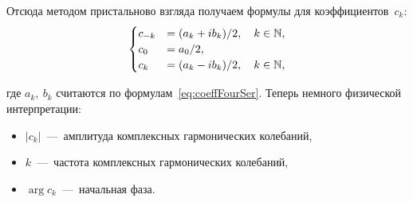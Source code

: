 \documentclass[../main.tex]{subfiles}
\begin{document}
Отсюда методом пристальново взгляда получаем формулы для коэффициентов~$c_k$:
\begin{align*}\label{eq:fourSerExp}
    \begin{cases}
    c_{-k} &= (a_k + ib_k)/2, \quad k \in \mathbb{N}, \\
    c_0 &= a_0 / 2, \\
    c_k &= (a_k - ib_k)/2, \quad k \in \mathbb{N},
    \end{cases} 
\end{align*} 

где $a_k,\ b_k$ считаются по формулам~\eqref{eq:coeffFourSer}.
Теперь немного физической интерпретации:
\begin{itemize}
    \item $\left\lvert c_k \right\rvert$~---~амплитуда комплексных гармонических колебаний,
    \item $k$~---~частота комплексных гармонических колебаний,
    \item  $\arg c_k$~---~начальная фаза.
\end{itemize} 
\end{document}
